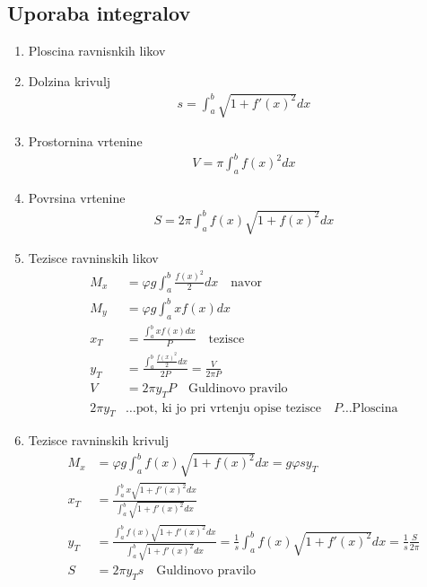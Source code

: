 \documentclass[a4paper,oneside,8pt]{extarticle}
\theoremstyle{definition}
\renewcommand{\phi}{\varphi}
\begin{document}
\begin{multicols}{2}
	\subsection*{Uporaba integralov}
	\begin{enumerate}
		\item Ploscina ravnisnkih likov
		\item Dolzina krivulj
		\begin{align*}
			s = \int_{a}^{b} \sqrt{1 + f'(x)^2} dx
		\end{align*}
		\item Prostornina vrtenine
		\begin{align*}
			V = \pi \int_{a}^{b} f(x)^2 dx
		\end{align*}
		\item Povrsina vrtenine
		\begin{align*}
			S = 2\pi \int_{a}^{b} f(x)\sqrt{1+f(x)^2} dx
		\end{align*}
		\item Tezisce ravninskih likov
		\begin{align*}
			M_x &= \phi g \int_{a}^{b} \frac{f(x)^2}{2} dx \quad \text{navor} \\
			M_y &= \phi g \int_{a}^{b} x f(x) dx \\
			x_T &= \frac{\int_{a}^{b} x f(x) dx}{P} \quad \text{tezisce}\\
			y_T &= \frac{\int_{a}^{b} \frac{f(x)^2}{2} dx}{2P} = \frac{V}{2\pi P}\\
			V &= 2\pi y_T P \quad \text{Guldinovo pravilo}\\
			2\pi y_T &\dots \text {pot, ki jo pri vrtenju opise tezisce} \quad P \dots \text{Ploscina}
		\end{align*}
		\item Tezisce ravninskih krivulj
		\begin{align*}
			M_x &= \phi g \int_{a}^{b} f(x)\sqrt{1+f(x)^2} dx  = g \phi s y_T\\
			x_T &= \frac{\int_{a}^{b} x\sqrt{1+f'(x)^2}dx}{\int_{a}^{b} \sqrt{1+f'(x)^2}dx}\\
			y_T &= \frac{\int_{a}^{b} f(x)\sqrt{1+f'(x)^2}dx}{\int_{a}^{b} \sqrt{1+f'(x)^2}dx} = \frac{1}{s} \int_{a}^{b} f(x)\sqrt{1+f'(x)^2} dx = \frac{1}{s} \frac{S}{2\pi}\\
			S &= 2\pi y_T s \quad \text{Guldinovo pravilo}
		\end{align*}
	\end{enumerate}
%

\end{multicols}
\end{document}
